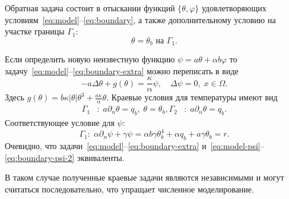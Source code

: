 Обратная задача состоит в отыскании функций $\{\theta, \varphi\}$
удовлетворяющих условиям~\eqref{eq:model}--\eqref{eq:boundary}, а также дополнительному условию
на участке границы $\Gamma_1$:
\begin{equation}
    \label{eq:boundary-extra}
    \theta = \theta_b \text{ на } \Gamma_1.
\end{equation}


Если определить новую неизвестную функцию $\psi = a\theta + \alpha b \varphi$ то
задачу~\eqref{eq:model}--\eqref{eq:boundary-extra} можно переписать в виде
\begin{equation}
    \label{eq:model-psi}
    - a \Delta \theta + g (\theta) = \frac{\kappa}{\alpha}\psi, \quad
    \Delta \psi = 0, \; x \in \Omega.
\end{equation}
Здесь $g(\theta) = b \kappa|\theta|\theta^3 + \frac{a\kappa}{\alpha}\theta$.
Краевые условия для температуры имеют вид
\begin{equation}
    \label{eq:boundary-psi-1}
    \begin{aligned}
        \Gamma_1&: \; a \partial_n \theta = q_b, \; \theta = \theta_b,
        \Gamma_2&: \;  a \partial_n \theta = q_b.
    \end{aligned}
\end{equation}
Соответствующее условие для $\psi$:
\begin{equation}
    \label{eq:boundary-psi-2}
        \Gamma_1: \; \alpha \partial_n \psi + \gamma \psi
        = \alpha b \gamma \theta_b^4
        + \alpha q_b + a \gamma \theta_b = r.
\end{equation}
Очевидно, что задачи~\eqref{eq:model}--\eqref{eq:boundary-extra} и~\eqref{eq:model-psi}--\eqref{eq:boundary-psi-2}
эквиваленты.

В таком случае полученные краевые задачи являются независимыми и могут считаться последовательно,
что упращает численное моделирование.

